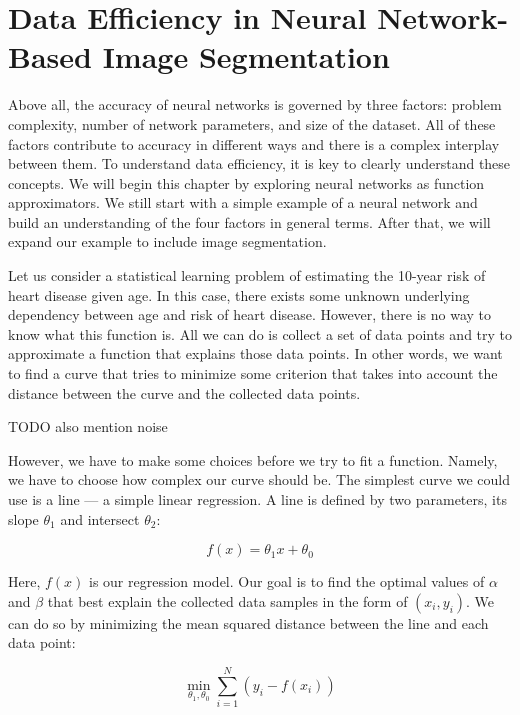 
\chapter{Data Efficiency in Neural Network-Based Image Segmentation}
\label{chap:data-efficiency}

Above all, the accuracy of neural networks is governed by three factors: problem complexity, number of network parameters, and size of the dataset. All of these factors contribute to accuracy in different ways and there is a complex interplay between them. To understand data efficiency, it is key to clearly understand these concepts. We will begin this chapter by exploring neural networks as function approximators. We still start with a simple example of a neural network and build an understanding of the four factors in general terms. After that, we will expand our example to include image segmentation.

Let us consider a statistical learning problem of estimating the 10-year risk of heart disease given age. In this case, there exists some unknown underlying dependency between age and risk of heart disease. However, there is no way to know what this function is. All we can do is collect a set of data points and try to approximate a function that explains those data points. In other words, we want to find a curve that tries to minimize some criterion that takes into account the distance between the curve and the collected data points.

TODO also mention noise

However, we have to make some choices before we try to fit a function. Namely, we have to choose how complex our curve should be. The simplest curve we could use is a line --- a simple linear regression. A line is defined by two parameters, its slope $\theta_1$ and intersect $\theta_2$:

\begin{equation}
	f(x) = \theta_1 x + \theta_0
\end{equation}

Here, $f(x)$ is our regression model. Our goal is to find the optimal values of $\alpha$ and $\beta$ that best explain the collected data samples in the form of $(x_i, y_i)$. We can do so by minimizing the mean squared distance between the line and each data point:

\begin{equation}
	\min_{\theta_1, \theta_0} \sum_{i=1}^N (y_i - f(x_i))
\end{equation}

